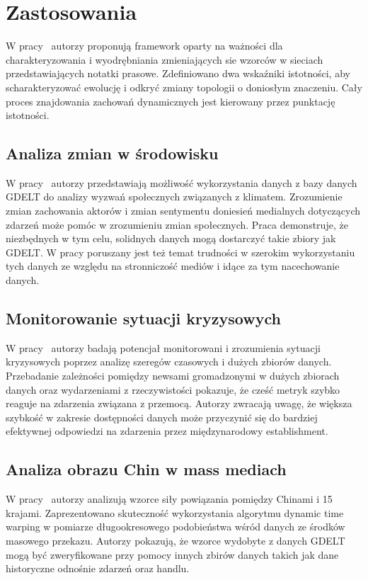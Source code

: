 \documentclass[11pt]{report}
\begin{document}
    \section{Zastosowania}\label{sec:zastosowania}
    W pracy~\cite{Yan2012} autorzy proponują framework oparty na ważności dla charakteryzowania
    i wyodrębniania zmieniających sie wzorców w sieciach przedstawiających notatki prasowe.
    Zdefiniowano dwa wskaźniki istotności, aby scharakteryzować ewolucję i odkryć zmiany topologii o doniosłym znaczeniu.
    Cały proces znajdowania zachowań dynamicznych jest kierowany przez punktację istotności.

    \subsection{Analiza zmian w środowisku}
    W pracy~\cite{Buckingham2020} autorzy przedstawiają możliwość wykorzystania danych z bazy danych GDELT
    do analizy wyzwań społecznych związanych z klimatem.
    Zrozumienie zmian zachowania aktorów i zmian sentymentu doniesień medialnych dotyczących zdarzeń może pomóc w zrozumieniu zmian społecznych.
    Praca demonstruje, że niezbędnych w tym celu, solidnych danych mogą dostarczyć takie zbiory jak GDELT\@.
    W pracy poruszany jest też temat trudności w szerokim wykorzystaniu tych danych ze względu na stronniczość mediów
    i idące za tym nacechowanie danych.

    \subsection{Monitorowanie sytuacji kryzysowych}
    W pracy~\cite{Levin2018} autorzy badają potencjał monitorowani i zrozumienia sytuacji kryzysowych poprzez analizę szeregów czasowych i dużych zbiorów danych.
    Przebadanie zależności pomiędzy newsami gromadzonymi w dużych zbiorach danych oraz wydarzeniami z rzeczywistości pokazuje,
    że cześć metryk szybko reaguje na zdarzenia związana z przemocą.
    Autorzy zwracają uwagę, że większa szybkość w zakresie dostępności danych może przyczynić się do bardziej efektywnej
    odpowiedzi na zdarzenia przez międzynarodowy establishment.

    \subsection{Analiza obrazu Chin w mass mediach}
    W pracy~\cite{Yuan2017} autorzy analizują wzorce siły powiązania pomiędzy Chinami i 15 krajami.
    Zaprezentowano skuteczność wykorzystania algorytmu dynamic time warping w pomiarze długookresowego podobieństwa
    wśród danych ze środków masowego przekazu.
    Autorzy pokazują, że wzorce wydobyte z danych GDELT mogą być zweryfikowane przy pomocy innych zbirów danych
    takich jak dane historyczne odnośnie zdarzeń oraz handlu.
\end{document}
